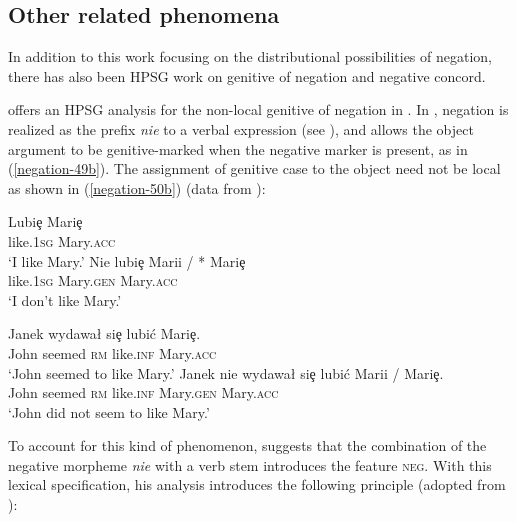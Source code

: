 \documentclass[output=paper
 	        ,biblatex
                ,babelshorthands
                ,newtxmath
                ,draftmode
                ,colorlinks, citecolor=brown
]{langscibook}
\begin{document}
\begin{exe}
\begin{xlist}
\section{Other related phenomena}

In addition to this work focusing on the distributional possibilities of negation, there has also
been HPSG work on genitive of negation and negative concord.

\citet{Prz:00} offers an HPSG analysis for the non-local genitive of negation in .  In
, negation is realized as the prefix \emph{nie} to a verbal expression (see
\citealt{PK:99, Prz:00, Prz:01}), and  allows the object argument to be genitive-marked
when the negative marker is present, as in (\ref{negation-49b}).  The assignment of genitive case
to the object need not be local as shown in (\ref{negation-50b}) (data from \citealt[]{Prz:00}):

\eal
\ex  \label{negation-genitive}
\gll Lubi\c{e} Mari\c{e} \\
     like.1\textsc{sg} Mary.\textsc{acc}\\%
\glt `I like Mary.'
\ex \label{negation-49b}
\gll Nie lubi\c{e} Marii / * Mari\c{e} \\
     \NEG{} like.1\textsc{sg} Mary.\textsc{gen} {} {} Mary.\textsc{acc}\\
\glt `I don't like Mary.'
\zl

\eal
\ex \label{negation-genitive-1}
\gll  Janek wydawa\l{} si\c{e} lubi\'{c} Mari\c{e}.\\
      John seemed \textsc{rm}     like.\textsc{inf} Mary.\textsc{acc}\\%
\glt `John seemed to like Mary.'
\ex \label{negation-50b}
\gll  Janek nie wydawa\l{} si\c{e} lubi\'{c} Marii / Mari\c{e}.\\
      John \NEG{} seemed \textsc{rm} like.\textsc{inf}      Mary.\textsc{gen} {} Mary.\textsc{acc}\\
\glt `John did not seem to like Mary.'
\zl

To account for this kind of phenomenon, \citet{Prz:00}
suggests that the combination of the
negative morpheme \emph{nie} with a verb stem introduces the
feature \textsc{neg}.
  With this lexical specification, his analysis introduces
 the following principle (adopted from \citealt[]{Prz:00}):


\end{xlist}
\end{exe}
\end{document}
